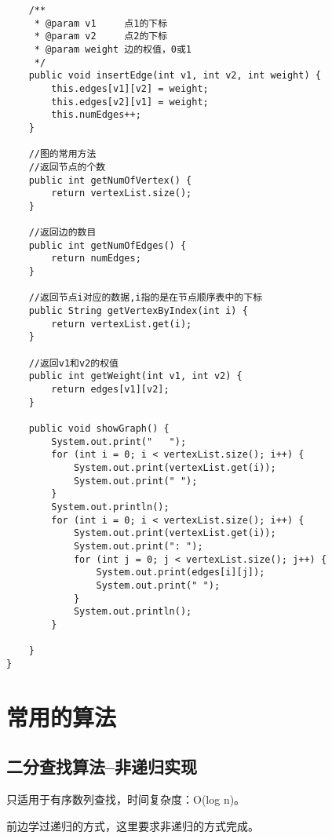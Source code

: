 \documentclass[a4paper]{report}
\begin{document}
\begin{lstlisting}
    /**
     * @param v1     点1的下标
     * @param v2     点2的下标
     * @param weight 边的权值，0或1
     */
    public void insertEdge(int v1, int v2, int weight) {
        this.edges[v1][v2] = weight;
        this.edges[v2][v1] = weight;
        this.numEdges++;
    }

    //图的常用方法
    //返回节点的个数
    public int getNumOfVertex() {
        return vertexList.size();
    }

    //返回边的数目
    public int getNumOfEdges() {
        return numEdges;
    }

    //返回节点i对应的数据,i指的是在节点顺序表中的下标
    public String getVertexByIndex(int i) {
        return vertexList.get(i);
    }

    //返回v1和v2的权值
    public int getWeight(int v1, int v2) {
        return edges[v1][v2];
    }

    public void showGraph() {
        System.out.print("   ");
        for (int i = 0; i < vertexList.size(); i++) {
            System.out.print(vertexList.get(i));
            System.out.print(" ");
        }
        System.out.println();
        for (int i = 0; i < vertexList.size(); i++) {
            System.out.print(vertexList.get(i));
            System.out.print(": ");
            for (int j = 0; j < vertexList.size(); j++) {
                System.out.print(edges[i][j]);
                System.out.print(" ");
            }
            System.out.println();
        }

    }
}
\end{lstlisting}

\chapter{常用的算法}
\section{二分查找算法--非递归实现}
只适用于有序数列查找，时间复杂度：O(log n)。

前边学过递归的方式，这里要求非递归的方式完成。
\end{document}
